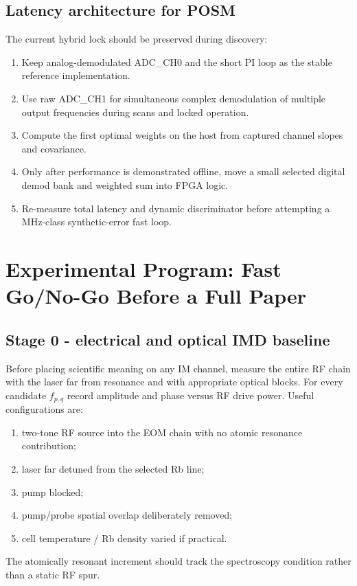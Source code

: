\documentclass[10pt]{article}
\begin{document}
\subsection{Latency architecture for POSM}
The current hybrid lock should be preserved during discovery:
\begin{enumerate}
\item Keep analog-demodulated ADC\_CH0 and the short PI loop as the stable reference implementation.
\item Use raw ADC\_CH1 for simultaneous complex demodulation of multiple output frequencies during scans and locked operation.
\item Compute the first optimal weights on the host from captured channel slopes and covariance.
\item Only after performance is demonstrated offline, move a small selected digital demod bank and weighted sum into FPGA logic.
\item Re-measure total latency and dynamic discriminator before attempting a MHz-class synthetic-error fast loop.
\end{enumerate}

\section{Experimental Program: Fast Go/No-Go Before a Full Paper}

\subsection{Stage 0 - electrical and optical IMD baseline}
Before placing scientific meaning on any IM channel, measure the entire RF chain with the laser far from resonance and with appropriate optical blocks. For every candidate $f_{p,q}$ record amplitude and phase versus RF drive power. Useful configurations are:
\begin{enumerate}
\item two-tone RF source into the EOM chain with no atomic resonance contribution;
\item laser far detuned from the selected Rb line;
\item pump blocked;
\item pump/probe spatial overlap deliberately removed;
\item cell temperature / Rb density varied if practical.
\end{enumerate}
The atomically resonant increment should track the spectroscopy condition rather than a static RF spur.
\end{document}
